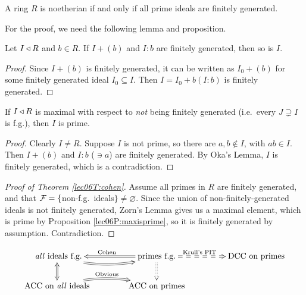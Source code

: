  \begin{theorem}[I.\ S.\ Cohen]\label{lec06T:cohen}
   A ring $R$ is noetherian if and only if all prime ideals are finitely generated.
 \end{theorem}
 For the proof, we need the following lemma and proposition.
 \begin{lemma}
   Let $I\triangleleft R$ and $b\in R$. If $I+(b)$ and $I:b$ are finitely generated, then so is $I$.
 \end{lemma}
 \begin{proof}
   Since $I+(b)$ is finitely generated, it can be written as $I_0+(b)$ for some finitely
   generated ideal $I_0\subseteq I$. Then $I = I_0+b(I:b)$ is finitely generated.
 \end{proof}
 \begin{proposition}\label{lec06P:maxisprime}
   If $I\triangleleft R$ is maximal with respect to \emph{not} being finitely generated (i.e.\ every
   $J\supsetneq I$ is f.g.), then $I$ is prime.
 \end{proposition}
 \begin{proof}
   Clearly $I\neq R$. Suppose $I$ is not prime, so there are $a,b\not\in I$, with $ab\in
   I$. Then $I+(b)$ and $I:b$ ($\ni a$) are finitely generated. By Oka's Lemma, $I$ is
   finitely generated, which is a contradiction.
 \end{proof}
 \begin{proof}[Proof of Theorem \ref{lec06T:cohen}]
   Assume all primes in $R$ are finitely generated, and that $\mathcal{F}=\{$non-f.g.\
   ideals$\}\neq \varnothing$. Since the union of non-finitely-generated ideals is not
   finitely generated, Zorn's Lemma gives us a maximal element, which is prime by
   Proposition \ref{lec06P:maxisprime}, so it is finitely generated by assumption.
   Contradiction.
 \end{proof}
 \[\xymatrix@!0 @R=3pc @C=10pc{
  \text{ \emph{all} ideals f.g.} \ar@{=>}@/_2.2ex/[r] \ar@{<=>}[d]
  &   \text{primes f.g.} \ar@{=>}[l]_{\text{Cohen}}
                         \ar@{==>}[r]^(.43){\text{Krull's PIT}}
                         \ar@{:>}[d]
  & \text{DCC on primes}\\
  \text{ACC on \emph{all} ideals} \ar@{=>}@/^2.2ex/[r]^{\text{Obvious}} & \text{ACC on primes}
 }\]

